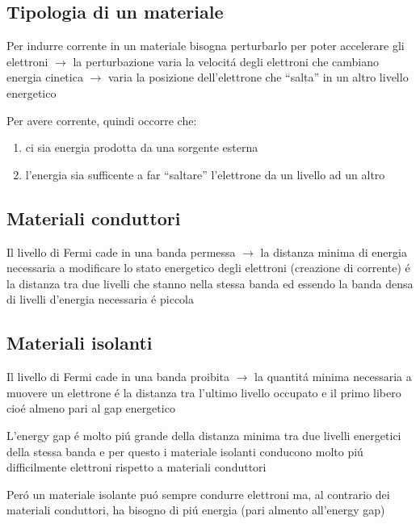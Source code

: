\subsection{Tipologia di un materiale}
Per indurre corrente in un materiale bisogna perturbarlo per poter accelerare gli elettroni $\rightarrow$ la perturbazione varia la velocit\'a degli elettroni che cambiano energia cinetica $\rightarrow$ varia la posizione dell'elettrone che ``salta'' in un altro livello energetico

Per avere corrente, quindi occorre che:
\begin{enumerate}
    \item ci sia energia prodotta da una sorgente esterna
    \item l'energia sia sufficente a far ``saltare'' l'elettrone da un livello ad un altro
\end{enumerate}

\subsection{Materiali conduttori}
Il livello di Fermi cade in una banda permessa $\rightarrow$ la distanza minima di energia necessaria a modificare lo stato energetico degli elettroni (creazione di corrente) \'e la distanza tra due livelli che stanno nella stessa banda ed essendo la banda densa di livelli d'energia necessaria \'e piccola

\subsection{Materiali isolanti}
Il livello di Fermi cade in una banda proibita $\rightarrow$ la quantit\'a minima necessaria a muovere un elettrone \'e la distanza tra l'ultimo livello occupato e il primo libero cio\'e almeno pari al gap energetico

L'energy gap \'e molto pi\'u grande della distanza minima tra due livelli energetici della stessa banda e per questo i materiale isolanti conducono molto pi\'u difficilmente elettroni rispetto a materiali conduttori

Per\'o un materiale isolante pu\'o sempre condurre elettroni ma, al contrario dei materiali conduttori, ha bisogno di pi\'u energia (pari almento all'energy gap)


